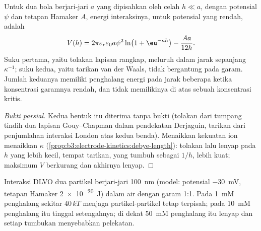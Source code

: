 \begin{theorem}\label{thm:b3:colloids:dlvo}
Untuk dua bola berjari-jari $a$ yang dipisahkan oleh celah $h \ll a$, dengan potensial 
$\psi$ dan tetapan Hamaker $A$, energi interaksinya, untuk potensial yang rendah, adalah
\[
  V(h) = 2\pi\varepsilon_r\varepsilon_0a\psi^2\ln\bigl(1 + \eu^{-\kappa h}\bigr) - \frac{Aa}{12h} .
\]
Suku pertama, yaitu tolakan lapisan rangkap, meluruh dalam jarak sepanjang  $\kappa^{-1}$;
suku kedua, yaitu tarikan van der Waals, tidak bergantung pada garam. Jumlah keduanya
memiliki penghalang energi pada jarak beberapa  ketika konsentrasi
garamnya rendah, dan tidak memilikinya di atas sebuah konsentrasi kritis.
\end{theorem}

\begin{proof}[Bukti parsial]
Kedua bentuk itu diterima tanpa bukti (tolakan dari tumpang tindih dua lapisan
Gouy--Chapman dalam pendekatan Derjaguin, tarikan dari penjumlahan interaksi
London atas kedua benda). Menaikkan kekuatan ion menaikkan $\kappa$
(\cref{prop:b3:electrode-kinetics:debye-length}): tolakan lalu lenyap pada
$h$ yang lebih kecil, tempat tarikan, yang tumbuh sebagai $1/h$, lebih kuat; maksimum
$V$ berkurang dan akhirnya lenyap.
\end{proof}

\begin{omfigure}

{\small Interaksi DLVO dua partikel berjari-jari \qty{100}{nm} (model: potensial 
\qty{-30}{mV}, tetapan Hamaker \qty{2e-20}{J}) dalam air dengan garam 1:1. Pada \qty{1}{mM}
penghalang sekitar $40\,kT$ menjaga partikel-partikel tetap terpisah; pada \qty{10}{mM} penghalang itu tinggal setengahnya;
di dekat \qty{50}{mM} penghalang itu lenyap dan setiap tumbukan menyebabkan pelekatan.}
\end{omfigure}

